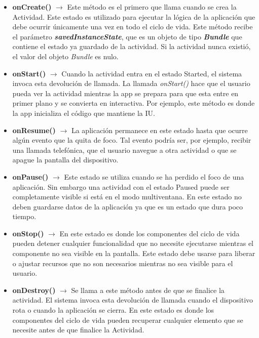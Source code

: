\begin {itemize}
\item \textbf{onCreate()} $\rightarrow$ Este m\'etodo es el primero que llama cuando se crea la Actividad. Este estado es utilizado para ejecutar la l\'ogica de la aplicaci\'on que debe ocurrir \'unicamente una vez en todo el ciclo de vida. Este m\'etodo recibe el par\'ametro \textit{\textbf{savedInstanceState}}, que es un objeto de tipo \textbf{\textit{Bundle}} que contiene el estado ya guardado de la actividad. Si la actividad nunca existi\'o, el valor del objeto \textit{Bundle} es nulo.
\item \textbf{onStart()} $\rightarrow$ Cuando la actividad entra en el estado Started, el sistema invoca esta devoluci\'on de llamada. La llamada \textit{onStart()} hace que el usuario pueda ver la actividad mientras la app se prepara para que esta entre en primer plano y se convierta en interactiva. Por ejemplo, este m\'etodo es donde la app inicializa el c\'odigo que mantiene la IU.
\item \textbf{onResume()} $\rightarrow$  La aplicaci\'on permanece en este estado hasta que ocurre alg\'un evento que la quita de foco. Tal evento podr\'ia ser, por ejemplo, recibir una llamada telef\'onica, que el usuario navegue a otra actividad o que se apague la pantalla del dispositivo.
\item \textbf{onPause()} $\rightarrow$ Este estado se utiliza cuando se ha perdido el foco de una aplicaci\'on. Sin embargo una actividad con el estado Paused puede ser completamente visible si est\'a en el modo multiventana. En este estado no deben guardarse datos de la aplicaci\'on ya que es un estado que dura poco tiempo.
\item \textbf{onStop()} $\rightarrow$ En este estado es donde los componentes del ciclo de vida pueden detener cualquier funcionalidad que no necesite ejecutarse mientras el componente no sea visible en la pantalla. Este estado debe usarse para liberar o ajustar recursos que no son necesarios mientras no sea visible para el usuario.
\item \textbf{onDestroy()} $\rightarrow$ Se llama a este m\'etodo antes de que se finalice la actividad. El sistema invoca esta devoluci\'on de llamada cuando el dispositivo rota o cuando la aplicaci\'on se cierra. En este estado es donde los componentes del ciclo de vida pueden recuperar cualquier elemento que se necesite antes de que finalice la Actividad.
\end {itemize}

